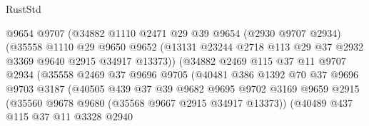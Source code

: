 \begin{lexlean}{RustStd}
\begin{coremodule}
                            @9654
                            @9707
                            (@34882
                              @1110
                              @2471
                              @29
                              @39
                              @9654
                              (@2930 @9707 @2934)
                              (@35558
                                @1110
                                @29
                                @9650
                                @9652
                                (@13131
                                  @23244
                                  @2718
                                  @113
                                  @29
                                  @37
                                  @2932
                                  @3369
                                  @9640
                                  @2915
                                  @34917
                                  @13373))
                              (@34882
                                @2469
                                @115
                                @37
                                @11
                                @9707
                                @2934
                                (@35558
                                  @2469
                                  @37
                                  @9696
                                  @9705
                                  (@40481
                                    @386
                                    @1392
                                    @70
                                    @37
                                    @9696
                                    @9703
                                    @3187
                                    (@40505
                                      @439
                                      @37
                                      @39
                                      @9682
                                      @9695
                                      @9702
                                      @3169
                                      @9659
                                      @2915
                                      (@35560 @9678 @9680 (@35568 @9667 @2915 @34917 @13373))
                                      (@40489
                                        @437
                                        @115
                                        @37
                                        @11
                                        @3328
                                        @2940

\end{coremodule}
\end{lexlean}
